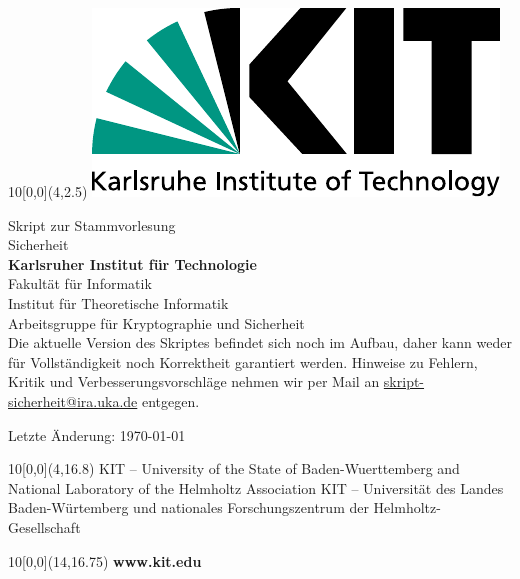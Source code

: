 \newcommand{\diameter}{20}
\newcommand{\xone}{-15}
\newcommand{\xtwo}{160}
\newcommand{\yone}{15}
\newcommand{\ytwo}{-253}

\begin{titlepage}



\begin{textblock}{10}[0,0](4,2.5)
  \includegraphics[width=.3\textwidth]{logos/KITLogo.pdf}
\end{textblock}
\vspace*{3cm}
\begin{center}
  \LARGE{Skript zur Stammvorlesung}
  \vspace*{1.5cm}\\
  \Huge{Sicherheit}\\
  \vspace*{3cm}
  \Large{\textbf{Karlsruher Institut für Technologie}\\
  \vspace*{6mm}
  Fakultät für Informatik\\
  \vspace*{4mm}
  Institut für Theoretische Informatik\\
  Arbeitsgruppe für Kryptographie und Sicherheit}\\
  
  \vspace*{2cm}
  Die aktuelle Version des Skriptes befindet sich noch im Aufbau, daher kann weder für Vollständigkeit noch Korrektheit garantiert werden. Hinweise zu Fehlern, Kritik und Verbesserungsvorschläge nehmen wir per Mail an \url{skript-sicherheit@ira.uka.de} entgegen.
  
  \vspace*{2cm}
  Letzte Änderung: \today
\end{center}


\begin{textblock}{10}[0,0](4,16.8)
\tiny{
  {KIT -- University of the State of Baden-Wuerttemberg and National Laboratory of the Helmholtz Association}
  {KIT -- Universität des Landes Baden-Würtemberg und nationales Forschungszentrum der Helmholtz-Gesellschaft}
}
\end{textblock}

\begin{textblock}{10}[0,0](14,16.75)
\large{
  \textbf{www.kit.edu}
}
\end{textblock}

\end{titlepage}

